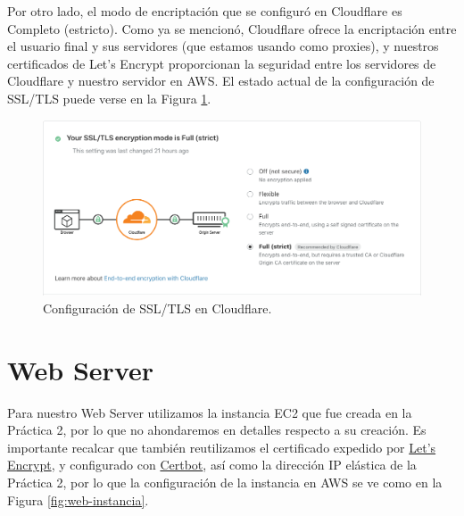 \documentclass{article}
\begin{document}
Por otro lado, el modo de encriptaci\'on que se
configur\'o en Cloudflare es Completo (estricto).
Como ya se mencion\'o, Cloudflare ofrece la
encriptaci\'on entre el usuario final y sus
servidores (que estamos usando como proxies),
y nuestros certificados de Let's Encrypt proporcionan
la seguridad entre los servidores de Cloudflare
y nuestro servidor en AWS.   El estado actual de
la configuraci\'on de SSL/TLS puede verse en la
Figura \ref{fig:cfEncryption}.

\begin{figure}[H]
  \centering
  \includegraphics[width=\textwidth]{cloudflare/cfEncryption}
  \caption{Configuraci\'on de SSL/TLS en Cloudflare.}
  \label{fig:cfEncryption}
\end{figure}




\section{Web Server}

Para nuestro Web Server utilizamos la instancia EC2 que
fue creada en la Pr\'actica 2, por lo que no ahondaremos
en detalles respecto a su creaci\'on.   Es importante
recalcar que tambi\'en reutilizamos el certificado
expedido por \href{https://letsencrypt.org/}{Let's Encrypt},
y configurado con \href{https://certbot.eff.org/}{Certbot},
as\'i como la direcci\'on IP el\'astica de la Pr\'actica 2,
por lo que la configuraci\'on de la instancia en AWS se ve
como en la Figura \ref{fig:web-instancia}.
\end{document}
